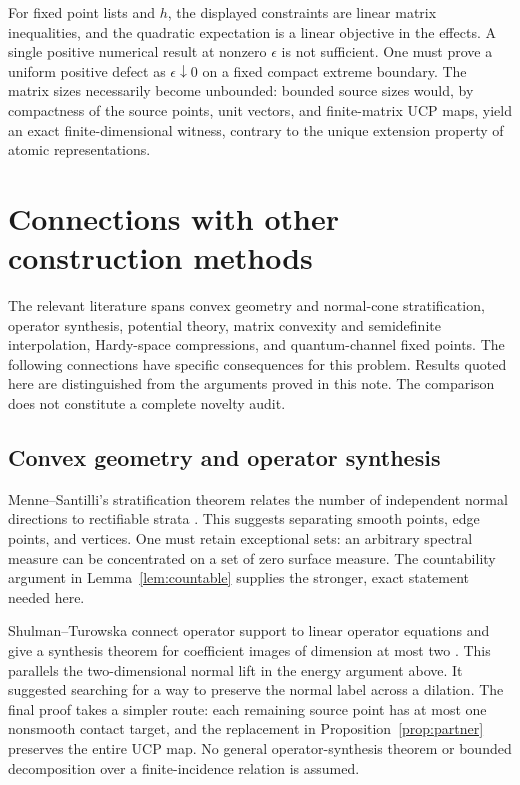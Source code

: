 \documentclass[11pt,letterpaper]{amsart}
\theoremstyle{definition}
\theoremstyle{remark}
\numberwithin{equation}{section}
\begin{document}
For fixed point lists and $h$, the displayed constraints are linear
matrix inequalities, and the quadratic expectation is a linear objective
in the effects. A single positive numerical result at nonzero
$\epsilon$ is not sufficient. One must prove a uniform positive defect
as $\epsilon\downarrow0$ on a fixed compact extreme boundary. The
matrix sizes necessarily become unbounded: bounded source sizes would,
by compactness of the source points, unit vectors, and finite-matrix
UCP maps, yield an exact finite-dimensional witness, contrary to the
unique extension property of atomic representations.

\section{Connections with other construction methods}
\label{sec:literature}

The relevant literature spans convex geometry and normal-cone stratification,
operator synthesis, potential theory, matrix convexity and semidefinite
interpolation, Hardy-space compressions, and quantum-channel fixed
points. The following connections have specific consequences for this
problem. Results quoted here are distinguished from the arguments proved
in this note. The comparison does not constitute a complete novelty audit.

\subsection{Convex geometry and operator synthesis}

Menne--Santilli's stratification theorem relates the number of independent
normal directions to rectifiable strata \cite[Theorem 4.12]{MS}.
This suggests separating smooth points, edge points, and vertices.
One must retain exceptional sets: an arbitrary spectral measure can be
concentrated on a set of zero surface measure. The countability argument
in Lemma~\ref{lem:countable} supplies the stronger, exact statement needed
here.

Shulman--Turowska connect operator support to linear operator equations
and give a synthesis theorem for coefficient images of dimension at
most two \cite[Theorem 11.1]{ST}. This parallels the two-dimensional normal
lift in the energy argument above. It suggested searching for a way
to preserve the normal label across a dilation. The final proof takes
a simpler route: each remaining source point has at most one nonsmooth contact target,
and the replacement in Proposition~\ref{prop:partner} preserves the
entire UCP map. No general operator-synthesis theorem or bounded
decomposition over a finite-incidence relation is assumed.
\end{document}
